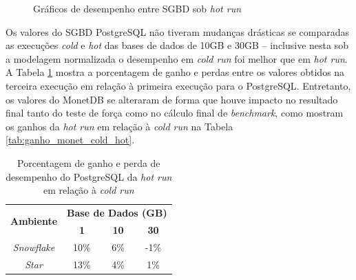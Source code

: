 \begin{figure}[t]
        \centering
        \caption{Gráficos de desempenho entre SGBD sob \textit{hot run}}
        \label{fig:qph_sgbd_hot}
\end{figure}

Os valores do SGBD PostgreSQL não tiveram mudanças drásticas se comparadas as execuções \textit{cold} e \textit{hot} das bases de dados de 10GB e 30GB -- inclusive nesta sob a modelagem normalizada o desempenho em \textit{cold run} foi melhor que em \textit{hot run}. A Tabela \ref{tab:ganho_postgresql_cold_hot} mostra a porcentagem de ganho e perdas entre os valores obtidos na terceira execução em relação à primeira execução para o PostgreSQL. Entretanto, os valores do MonetDB se alteraram de forma que houve impacto no resultado final tanto do teste de força como no cálculo final de \textit{benchmark}, como mostram os ganhos da \textit{hot run} em relação à \textit{cold run} na Tabela \ref{tab:ganho_monet_cold_hot}.

\begin{table}[htpb]
        \centering
        \caption{Porcentagem de ganho e perda de desempenho do PostgreSQL da \textit{hot run} em relação à \textit{cold run}}
        \label{tab:ganho_postgresql_cold_hot}
        \begin{tabular}{|c|c|c|c|}
        \hline
        \multirow{2}{*}{\textbf{Ambiente}} & \multicolumn{3}{c|}{\textbf{Base de Dados (GB)}} \\ \cline{2-4} 
        & \textbf{1}     & \textbf{10}    & \textbf{30}    \\ \hline
        \textit{Snowflake}                 & 10\%           & 6\%            & -1\%           \\ \hline
        \textit{Star}                      & 13\%           & 4\%            & 1\%            \\ \hline
        \end{tabular}
\end{table}

